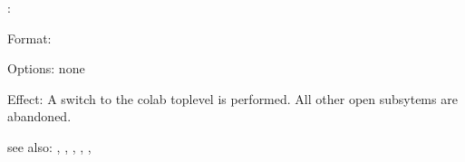 \colab{} \colab:

Format: 

Options: none

Effect: A switch to the colab toplevel is performed. All other open
	subsytems are abandoned.
       
see also: \rfi, \rfe, \relfun, \contax, \taxon, \forward
